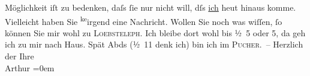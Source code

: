 \begin{ledgroupsized}[t]{13cm}
                    Möglichkeit iſt zu bedenken, daſs ſie nur nicht will, dſs \uline{ich} heut hinaus komme. {\pb}Vielleicht
                    haben Sie \substVorne{}\textsuperscript{ke}\substDazwischen{}ir\substHinten{}gend eine Nachricht.\pend
           \pstart
           Wollen Sie noch was wiſſen, ſo können Sie mir wohl zu \textsc{Loebs}\textsc{teleph}. Ich
                    bleibe dort wohl bis ½ 5 oder 5, da{\geminationn} geh ich zu mir nach Haus. Spät Abds
                        (½ 11 denk ich) {\pb}bin ich im \textsc{Pucher}. –\pend
           \pstart
           Herzlich der Ihre{\\[\baselineskip]}\spacefill\mbox{Arthur}\pend
           \leftskip=0em{}\endnumbering{}\end{ledgroupsized}  \newcommand{\dateiname}{L00645}\newcommand{\titel}{Arthur Schnitzler an Hugo von Hofmannsthal, [9. 2. 1897?]}\newcommand{\editorInnen}{Martin Anton Müller und Gerd-Hermann Susen}
      
